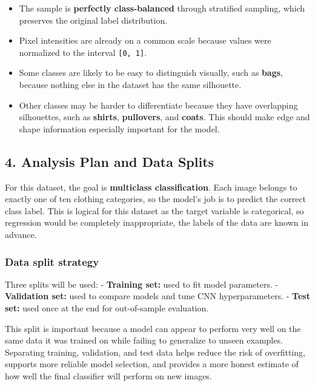 \documentclass[11pt]{article}
\providecommand{\tightlist}{%
      \setlength{\itemsep}{0pt}\setlength{\parskip}{0pt}}
\begin{document}
\begin{itemize}
\tightlist
\item
  The sample is \textbf{perfectly class-balanced} through stratified
  sampling, which preserves the original label distribution.
\item
  Pixel intensities are already on a common scale because values were
  normalized to the interval \texttt{{[}0,\ 1{]}}.
\item
  Some classes are likely to be easy to distinguish visually, such as
  \textbf{bags}, because nothing else in the dataset has the same
  silhouette.
\item
  Other classes may be harder to differentiate because they have
  overlapping silhouettes, such as \textbf{shirts}, \textbf{pullovers},
  and \textbf{coats}. This should make edge and shape information
  especially important for the model.
\end{itemize}

    \subsection{4. Analysis Plan and Data
Splits}\label{analysis-plan-and-data-splits}

For this dataset, the goal is \textbf{multiclass classification}. Each
image belongs to exactly one of ten clothing categories, so the model's
job is to predict the correct class label. This is logical for this
dataset as the target variable is categorical, so regression would be
completely inappropriate, the labels of the data are known in advance.

\subsubsection{Data split strategy}\label{data-split-strategy}

Three splits will be used: - \textbf{Training set:} used to fit model
parameters. - \textbf{Validation set:} used to compare models and tune
CNN hyperparameters. - \textbf{Test set:} used once at the end for
out-of-sample evaluation.

This split is important because a model can appear to perform very well
on the same data it was trained on while failing to generalize to unseen
examples. Separating training, validation, and test data helps reduce
the risk of overfitting, supports more reliable model selection, and
provides a more honest estimate of how well the final classifier will
perform on new images.
\end{document}
